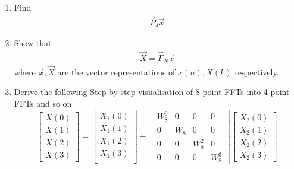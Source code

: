 \documentclass[journal,12pt,twocolumn]{IEEEtran}
\renewcommand\thesection{\arabic{section}}
\begin{document}
\begin{enumerate}[label=\arabic*.,ref=\thesection.\theenumi]
\item Find 
    \begin{align}
	     \vec{P}_4 \vec{x}
    \end{align}
\item Show that 
    \begin{align}
	    \vec{X} = \vec{F}_N \vec{x}
	    \label{eq:dft-mat-def}
    \end{align}
		where $\vec{x}, \vec{X}$ are the vector representations of $x(n), X(k)$ respectively.
\item Derive the following Step-by-step visualisation  of
8-point FFTs into 4-point FFTs and so on
\begin{equation}
\begin{bmatrix}
X(0) \\ 
X(1) \\ 
X(2) \\ 
X(3)
\end{bmatrix}
=
\begin{bmatrix}
X_{1}(0) \\ 
X_{1}(1)\\ 
X_{1}(2)\\
X_{1}(3)\\
\end{bmatrix}
+
\begin{bmatrix}
W^{0}_{8} & 0 & 0 & 0\\
0 & W^{1}_{8} & 0 & 0\\
0 & 0 & W^{2}_{8} & 0\\
0 & 0 & 0 & W^{3}_{8}
\end{bmatrix}
\begin{bmatrix}
X_{2}(0) \\ 
X_{2}(1) \\ 
X_{2}(2) \\
X_{2}(3)
\end{bmatrix}
\end{equation}


\end{enumerate}
\end{document}
